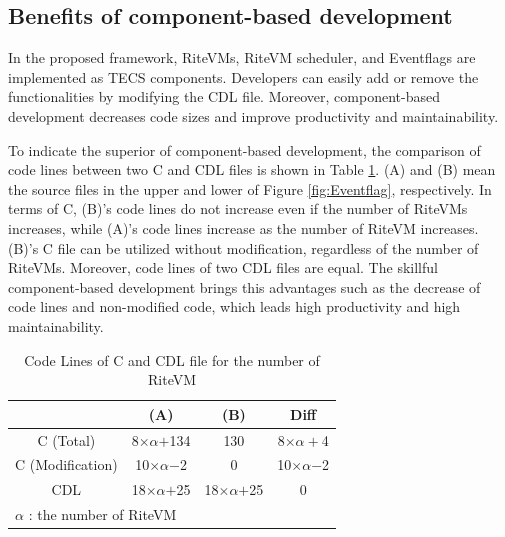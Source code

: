 \documentclass{sig-alternate-05-2015}
\begin{document}
\subsection{Benefits of component-based development}
In the proposed framework, RiteVMs, RiteVM scheduler, and Eventflags are implemented as TECS components.
Developers can easily add or remove the functionalities by modifying the CDL file.
Moreover, component-based development decreases code sizes and improve productivity and maintainability.

To indicate the superior of component-based development, the comparison of code lines between two C and CDL files is shown in Table \ref{tab:codesize}.
(A) and (B) mean the source files in the upper and lower of Figure \ref{fig:Eventflag}, respectively. 
In terms of C, (B)'s code lines do not increase even if the number of RiteVMs increases, while (A)'s code lines increase as the number of RiteVM increases.
(B)'s C file can be utilized without modification, regardless of the number of RiteVMs.
Moreover, code lines of two CDL files are equal.
The skillful component-based development brings this advantages such as the decrease of code lines and non-modified code, which leads high productivity and high maintainability.

\begin{table}[t]
    \centering
    \vspace{1mm}
\caption{Code Lines of C and CDL file for the number of RiteVM}
    \vspace{1mm}
    {\tabcolsep=0.2cm
    \begin{tabular}{c||c|c|c}
                & (A)       & (B)     & Diff  \\ \hline
        C (Total)      & 8$\times$$\alpha$$+$134  & 130     & 8$\times$$\alpha+$4\\
        C (Modification)   & 10$\times\alpha$$-$2 & 0   &  10$\times\alpha$$-$2 \\
        CDL    & 18$\times$$\alpha$$+$25   & 18$\times$$\alpha$$+$25 & 0     \\
        \multicolumn{3}{l}{{\small $\alpha$} : {\scriptsize the number of RiteVM}}
    \end{tabular}
    }
    \label{tab:codesize}
\end{table}
\end{document}
